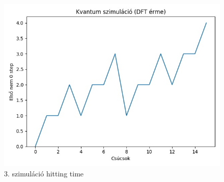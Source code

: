 \documentclass[14pt,a4paper]{article}
\begin{document}
\begin{figure}[H]
\centering
\includegraphics[width = 0.7\columnwidth]{sim_03/hitting_time.jpg}
\caption{3. szimuláció hitting time}
\end{figure}
\end{document}
